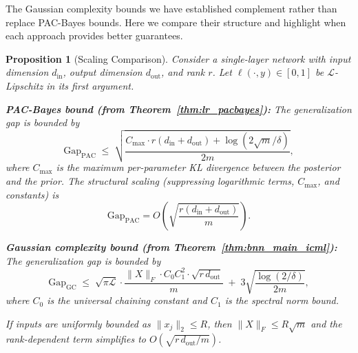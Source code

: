\documentclass{article}
\theoremstyle{plain}
\newtheorem{proposition}[theorem]{Proposition}
\theoremstyle{definition}
\theoremstyle{remark}
\begin{document}
The Gaussian complexity bounds we have established complement rather than replace PAC-Bayes bounds. Here we compare their structure and highlight when each approach provides better guarantees.

\begin{proposition}[Scaling Comparison]
\label{prop:scaling_comparison}
Consider a single-layer network with input dimension $d_{\text{in}}$, output dimension $d_{\text{out}}$, and rank $r$. Let $\ell(\cdot,y)\in[0,1]$ be $\mathcal{L}$-Lipschitz in its first argument.

\textbf{PAC-Bayes bound (from Theorem~\ref{thm:lr_pacbayes}):}
The generalization gap is bounded by
\begin{equation}\label{eq:gap_pac}
\text{Gap}_{\text{PAC}}
\;\le\;
\sqrt{\frac{C_{\max} \cdot r(d_{\text{in}} + d_{\text{out}}) + \log(2\sqrt{m}/\delta)}{2m}},
\end{equation}
where $C_{\max}$ is the maximum per-parameter KL divergence between the posterior and the prior. The structural scaling (suppressing logarithmic terms, $C_{\max}$, and constants) is
\[
\text{Gap}_{\text{PAC}} = O\!\left(\sqrt{\frac{r(d_{\text{in}}+d_{\text{out}})}{m}}\right).
\]

\textbf{Gaussian complexity bound (from Theorem~\ref{thm:bnn_main_icml}):}
The generalization gap is bounded by
\begin{equation}\label{eq:gap_gc}
\text{Gap}_{\text{GC}}
\;\le\;
\sqrt{\pi\mathcal{L}} \cdot \frac{\|X\|_F \cdot C_0 C_1^2 \cdot \sqrt{r\, d_{\text{out}}}}{m}
\;+\;
3\sqrt{\frac{\log(2/\delta)}{2m}},
\end{equation}
where $C_0$ is the universal chaining constant and $C_1$ is the spectral norm bound.

If inputs are uniformly bounded as $\|x_j\|_2 \le R$, then $\|X\|_F \le R\sqrt{m}$ and the rank-dependent term simplifies to $O(\sqrt{r\,d_{\text{out}}/m})$.
\end{proposition}
\end{document}

